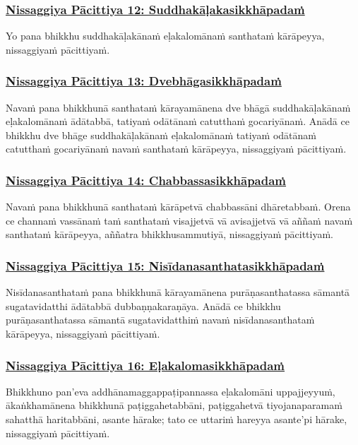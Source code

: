 \subsubsection*{\hyperref[forf-exp12]{Nissaggiya Pācittiya 12: Suddhakāḷakasikkhāpadaṁ}}
\label{np12}
Yo pana bhikkhu suddhakāḷakānaṁ eḷakalomānaṁ santhataṁ kārāpeyya, nissaggiyaṁ pācittiyaṁ.

\subsubsection*{\hyperref[forf-exp13]{Nissaggiya Pācittiya 13: Dvebhāgasikkhāpadaṁ}}
\label{np13}
Navaṁ pana bhikkhunā santhataṁ kārayamānena dve bhāgā suddhakāḷakānaṁ eḷakalomānaṁ ādātabbā, tatiyaṁ odātānaṁ catutthaṁ gocariyānaṁ. Anādā ce bhikkhu dve bhāge suddhakāḷakānaṁ eḷakalomānaṁ tatiyaṁ odātānaṁ catutthaṁ gocariyānaṁ navaṁ santhataṁ kārāpeyya, nissaggiyaṁ pācittiyaṁ.

\subsubsection*{\hyperref[forf-exp14]{Nissaggiya Pācittiya 14: Chabbassasikkhāpadaṁ}}
\label{np14}
Navaṁ pana bhikkhunā santhataṁ kārāpetvā chabbassāni dhāretabbaṁ. Orena ce channaṁ vassānaṁ taṁ santhataṁ visajjetvā vā avisajjetvā vā aññaṁ navaṁ santhataṁ kārāpeyya, aññatra bhikkhusammutiyā, nissaggiyaṁ pācittiyaṁ.

\subsubsection*{\hyperref[forf-exp15]{Nissaggiya Pācittiya 15: Nisīdanasanthatasikkhāpadaṁ}}
\label{np15}
Nisīdanasanthataṁ pana bhikkhunā kārayamānena purāṇasanthatassa sāmantā sugatavidatthi ādātabbā dubbaṇṇakaraṇāya. Anādā ce bhikkhu purāṇasanthatassa sāmantā sugatavidatthiṁ navaṁ nisīdanasanthataṁ kārāpeyya, nissaggiyaṁ pācittiyaṁ.

\subsubsection*{\hyperref[forf-exp16]{Nissaggiya Pācittiya 16: Eḷakalomasikkhāpadaṁ}}
\label{np16}
Bhikkhuno pan'eva addhānamaggappaṭipannassa eḷakalomāni uppajjeyyuṁ, ākaṅkhamānena bhikkhunā paṭiggahetabbāni, paṭiggahetvā tiyojanaparamaṁ sahatthā haritabbāni, asante hārake; tato ce uttariṁ hareyya asante'pi hārake, nissaggiyaṁ pācittiyaṁ.

